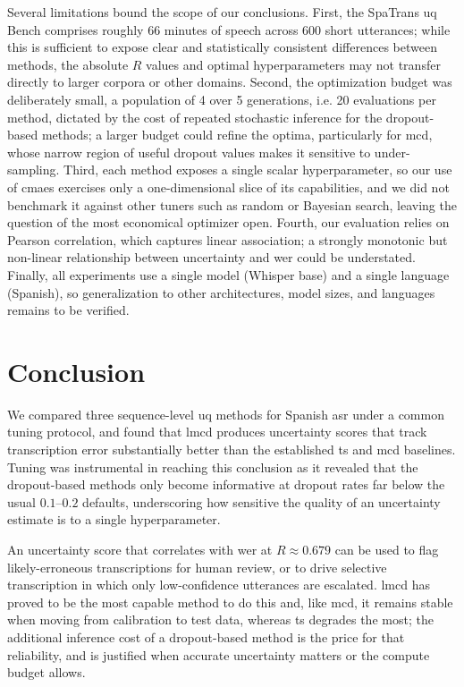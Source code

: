 \documentclass[runningheads]{llncs}
\newcommand{\lmcdTestR}{0.679}          %
\begin{document}
Several limitations bound the scope of our conclusions. First, the SpaTrans \acrshort{uq} Bench comprises roughly 66 minutes of speech across 600 short utterances; while this is sufficient to expose clear and statistically consistent differences between methods, the absolute $R$ values and optimal hyperparameters may not transfer directly to larger corpora or other domains. Second, the optimization budget was deliberately small, a population of 4 over 5 generations, i.e. 20 evaluations per method, dictated by the cost of repeated stochastic inference for the dropout-based methods; a larger budget could refine the optima, particularly for \acrshort{mcd}, whose narrow region of useful dropout values makes it sensitive to under-sampling. Third, each method exposes a single scalar hyperparameter, so our use of \acrshort{cmaes} exercises only a one-dimensional slice of its capabilities, and we did not benchmark it against other tuners such as random \cite{bergstra2012random} or Bayesian \cite{snoek2012practical} search, leaving the question of the most economical optimizer open. Fourth, our evaluation relies on Pearson correlation, which captures linear association; a strongly monotonic but non-linear relationship between uncertainty and \acrshort{wer} could be understated. Finally, all experiments use a single model (Whisper base) and a single language (Spanish), so generalization to other architectures, model sizes, and languages remains to be verified.


\section{Conclusion}

We compared three sequence-level \acrshort{uq} methods for Spanish \acrshort{asr} under a common tuning protocol, and found that \acrshort{lmcd} produces uncertainty scores that track transcription error substantially better than the established \acrshort{ts} and \acrshort{mcd} baselines. Tuning was instrumental in reaching this conclusion as it revealed that the dropout-based methods only become informative at dropout rates far below the usual $0.1$--$0.2$ defaults, underscoring how sensitive the quality of an uncertainty estimate is to a single hyperparameter.

An uncertainty score that correlates with \acrshort{wer} at $R \approx \lmcdTestR$ can be used to flag likely-erroneous transcriptions for human review, or to drive selective transcription in which only low-confidence utterances are escalated. \acrshort{lmcd} has proved to be the most capable method to do this and, like \acrshort{mcd}, it remains stable when moving from calibration to test data, whereas \acrshort{ts} degrades the most; the additional inference cost of a dropout-based method is the price for that reliability, and is justified when accurate uncertainty matters or the compute budget allows.
\end{document}
